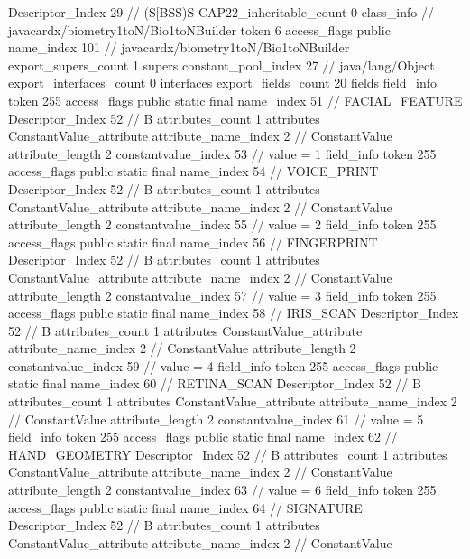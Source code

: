 {{{{{					Descriptor_Index	29		// (S[BSS)S
				}
			}
			CAP22_inheritable_count	0
		}
		class_info {		// javacardx/biometry1toN/Bio1toNBuilder
			token	6
			access_flags	public
			name_index	101		// javacardx/biometry1toN/Bio1toNBuilder
			export_supers_count	1
			supers {
				constant_pool_index	27		// java/lang/Object
			}
			export_interfaces_count	0
			interfaces {
			}
			export_fields_count	20
			fields {
			field_info {
				token	255
				access_flags	public static final
				name_index	51		// FACIAL_FEATURE
				Descriptor_Index	52		// B
				attributes_count	1
				attributes {
				ConstantValue_attribute {
					attribute_name_index	2		// ConstantValue
					attribute_length	2
					constantvalue_index	53		// value = 1
				}
				}
			}
			field_info {
				token	255
				access_flags	public static final
				name_index	54		// VOICE_PRINT
				Descriptor_Index	52		// B
				attributes_count	1
				attributes {
				ConstantValue_attribute {
					attribute_name_index	2		// ConstantValue
					attribute_length	2
					constantvalue_index	55		// value = 2
				}
				}
			}
			field_info {
				token	255
				access_flags	public static final
				name_index	56		// FINGERPRINT
				Descriptor_Index	52		// B
				attributes_count	1
				attributes {
				ConstantValue_attribute {
					attribute_name_index	2		// ConstantValue
					attribute_length	2
					constantvalue_index	57		// value = 3
				}
				}
			}
			field_info {
				token	255
				access_flags	public static final
				name_index	58		// IRIS_SCAN
				Descriptor_Index	52		// B
				attributes_count	1
				attributes {
				ConstantValue_attribute {
					attribute_name_index	2		// ConstantValue
					attribute_length	2
					constantvalue_index	59		// value = 4
				}
				}
			}
			field_info {
				token	255
				access_flags	public static final
				name_index	60		// RETINA_SCAN
				Descriptor_Index	52		// B
				attributes_count	1
				attributes {
				ConstantValue_attribute {
					attribute_name_index	2		// ConstantValue
					attribute_length	2
					constantvalue_index	61		// value = 5
				}
				}
			}
			field_info {
				token	255
				access_flags	public static final
				name_index	62		// HAND_GEOMETRY
				Descriptor_Index	52		// B
				attributes_count	1
				attributes {
				ConstantValue_attribute {
					attribute_name_index	2		// ConstantValue
					attribute_length	2
					constantvalue_index	63		// value = 6
				}
				}
			}
			field_info {
				token	255
				access_flags	public static final
				name_index	64		// SIGNATURE
				Descriptor_Index	52		// B
				attributes_count	1
				attributes {
				ConstantValue_attribute {
					attribute_name_index	2		// ConstantValue
}}}}}}}
